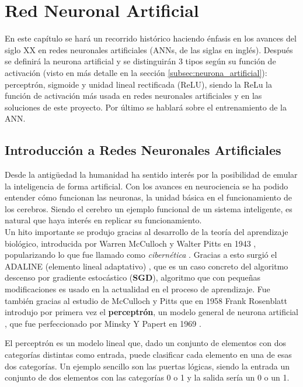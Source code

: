 \chapter{Red Neuronal Artificial}\label{redneuronal}

En este capítulo se hará un recorrido histórico haciendo énfasis en los avances del siglo XX en redes neuronales artificiales (ANNs, de las siglas en inglés). Después se definirá la neurona artificial y se distinguirán 3 tipos según su función de activación (visto en más detalle en la sección \ref{subsec:neurona_artificial}): perceptrón, sigmoide y unidad lineal rectificada (ReLU), siendo la ReLu la función de activación más usada en redes neuronales artificiales \cite{Ramachandran2017} y en las soluciones de este proyecto. Por último se hablará sobre el entrenamiento de la ANN.

\section{Introducción a Redes Neuronales Artificiales}\label{subsec:nn_intro}

Desde la antigüedad la humanidad ha sentido interés por la posibilidad de emular la inteligencia de forma artificial. Con los avances en neurociencia se ha podido entender cómo funcionan las neuronas, la unidad básica en el funcionamiento de los cerebros. Siendo el cerebro un ejemplo funcional de un sistema inteligente, es natural  que haya interés en replicar su funcionamiento.\\

Un hito importante se produjo gracias al desarrollo de la teoría del aprendizaje biológico, introducida por Warren McCulloch y Walter Pitts en 1943 \cite{McCulloch1943}, popularizando lo que fue llamado como \emph{cibernética} \cite[p13]{Goodfellow2016}. Gracias a esto surgió el ADALINE (elemento lineal adaptativo) \cite{Widrow2015}, que es un caso concreto del algoritmo descenso por gradiente estocástico (\textbf{SGD}), algoritmo que con pequeñas modificaciones es usado en la actualidad en el proceso de aprendizaje\cite[p14]{Goodfellow2016}. Fue también gracias al estudio de McCulloch y Pitts que en 1958 Frank Rosenblatt introdujo por primera vez el \textbf{perceptrón}, un modelo general de neurona artificial \cite{Rosenblatt1958}, que fue perfeccionado por Minsky Y Papert en 1969 \cite{Minsky1969}.

El perceptrón es un modelo lineal que, dado un conjunto de elementos con dos categorías distintas como entrada, puede clasificar cada elemento en una de esas dos categorías. Un ejemplo sencillo son las puertas lógicas, siendo la entrada un conjunto de dos elementos con las categorías 0 o 1 y la salida sería un 0 o un 1.

